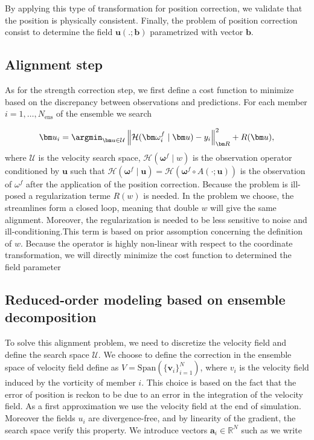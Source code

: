 By applying this type of transformation for position correction, we validate that the position is physically consistent. Finally, the problem of position correction consist to determine the field $\bm u(.; \bm b)$ parametrized with vector $\bm b$.

\subsection*{Alignment step}

As for the strength correction step, we first define a cost function to minimize based on the discrepancy between observations and predictions. For each member $i = 1, \dots, N_{\text{ens}}$  of the ensemble we search

\begin{equation*}
    \bm u_i = \argmin_{\bm u \in \mathcal U} \left\|\mathcal H(\bm \omega^f_i \mid \bm u) - y_i \right\|_{\bm R}^2 + R(\bm u),
\end{equation*}where $\mathcal U$ is the velocity search space, $\mathcal H(\bm \omega^f \mid w)$ is the observation operator conditioned by $\bm u$ such that $\mathcal H(\bm \omega^f \mid \bm u) = \mathcal H(\bm \omega^f \circ A(\cdot; \bm u))$ is the observation of $\omega^f$ after the application of the position correction. Because the problem is ill-posed a regularization terme $R(w)$ is needed. In the problem we choose, the streamlines form a closed loop, meaning that double $w$ will give the same alignment. Moreover, the regularization is needed to be less sensitive to noise and ill-conditioning.This term is based on prior assomption concerning the definition of $w$.
Because the operator is highly non-linear with respect to the coordinate transformation, we will directly minimize the cost function to determined the field parameter

\subsection{Reduced-order modeling based on ensemble decomposition}%

To solve this alignment problem, we need to discretize the velocity field and define the search space $\mathcal U$. We choose to define the correction in the ensemble space of velocity field define as $V = \text{Span}(\{\mathbf{v}_i\}_{i = 1}^N)$, where $v_i$ is the velocity field induced by the vorticity of member $i$. This choice is based on the fact that the error of position is reckon to be due to an error in the integration of the velocity field.  As a first approximation we use the velocity field at the end of simulation. Moreover the fields $u_i$ are divergence-free, and by linearity of the gradient, the search space verify this property. We introduce vectors $\bm a_i \in \mathbb R^N$ such as we write

